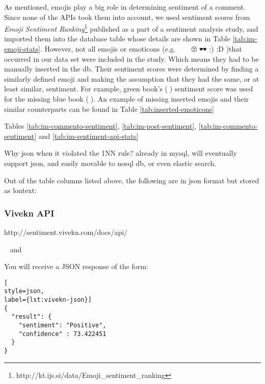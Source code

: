 

\newpage

As mentioned, emojis play a big role in determining sentiment of a comment. 
Since none of the APIs took them into account, we used sentiment scores from \emph{Emoji Sentiment Ranking}\footnote{http://kt.ijs.si/data/Emoji\_sentiment\_ranking} published as a part of a sentiment analysis study\cite{Kralj2015emojis},  and imported them into the database table  whose details are shown in Table \ref{tab:im-emoji-stats}.  
However, not all emojis or emoticons (e.g. 📘 🍾 🙂 🙄 🕶 :) :D )that occurred in our data set were included in the study.
Which means they had to be manually inserted in the db. 
Their sentiment scores were determined by finding a similarly defined emoji and making the assumption that they had the same, or at least similar, sentiment. 
For example, green book's (📗) sentiment score was used for the missing blue book (📘). 
An example of missing inserted emojis and their similar counterparts can be found in Table \ref{tab:inserted-emoticons}



Tables \ref{tab:im-commento-sentiment}, \ref{tab:im-post-sentiment}, \ref{tab:im-commento-sentiment} and \ref{tab:im-sentiment-api-stats}  

Why json when it violated the 1NN rule? already in mysql, will eventually support json, and easily movable to nosql db, or even elastic search. 

Out of the table columns listed above, the following are in json format but stored as lontext:

\subsubsection*{Vivekn API}
\begin{description}
\singlespacing
 \item[Web url:] http://sentiment.vivekn.com/docs/api/
 \item[Database columns:]  and 
\end{description}
You will receive a JSON response of the form:
\begin{lstlisting}[
style=json,
label={lst:vivekn-json}]
{ 
  "result": { 
    "sentiment": "Positive", 
    "confidence" : 73.422451 
  } 
}
\end{lstlisting}

